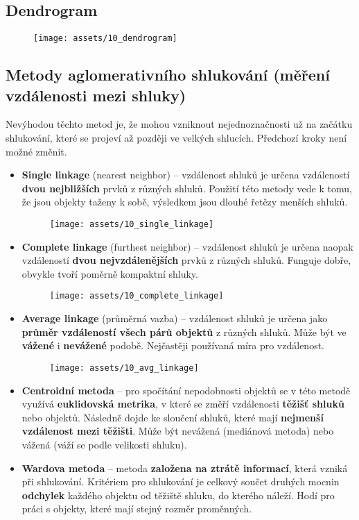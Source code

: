 \subsection{Dendrogram}
\begin{figure}[H]
    \centering
    \texttt{[image: assets/10\_dendrogram]}
\end{figure}

\subsection{Metody aglomerativního shlukování (měření vzdálenosti mezi shluky)}
Nevýhodou těchto metod je, že mohou vzniknout nejednoznačnosti už na začátku shlukování, které se projeví až později ve velkých shlucích. Předchozí kroky není možné změnit.
\begin{itemize}
    \item \textbf{Single linkage} (nearest neighbor) -- vzdálenost shluků je určena vzdáleností \textbf{dvou nejbližších} prvků z různých shluků. Použití této metody vede k tomu, že jsou objekty taženy k sobě, výsledkem jsou dlouhé řetězy menších shluků.
          \begin{figure}[H]
              \centering
              \texttt{[image: assets/10\_single\_linkage]}
          \end{figure}
    \item \textbf{Complete linkage} (furthest neighbor) -- vzdálenost shluků je určena naopak vzdáleností \textbf{dvou nejvzdálenějších} prvků z různých shluků. Funguje dobře, obvykle tvoří poměrně kompaktní shluky.
          \begin{figure}[H]
              \centering
              \texttt{[image: assets/10\_complete\_linkage]}
          \end{figure}
    \item \textbf{Average linkage} (průměrná vazba) -- vzdálenost shluků je určena jako \textbf{průměr vzdáleností všech párů objektů} z různých shluků. Může být ve \textbf{vážené} i \textbf{nevážené} podobě. Nejčastěji používaná míra pro vzdálenost.
          \begin{figure}[H]
              \centering
              \texttt{[image: assets/10\_avg\_linkage]}
          \end{figure}
    \item \textbf{Centroidní metoda} -- pro spočítání nepodobnosti objektů se v této metodě využívá \textbf{euklidovská metrika}, v které se změří vzdálenosti \textbf{těžišť shluků} nebo objektů. Následně dojde ke sloučení shluků, které mají \textbf{nejmenší vzdálenost mezi těžišti}. Může být nevážená (mediánová metoda) nebo vážená (váží se podle velikosti shluku).
    \item \textbf{Wardova metoda} -- metoda \textbf{založena na ztrátě informací}, která vzniká při shlukování. Kritériem pro shlukování je celkový součet druhých mocnin \textbf{odchylek} každého objektu od těžiště shluku, do kterého náleží.  Hodí pro práci s objekty, které mají stejný rozměr proměnných.
\end{itemize}

